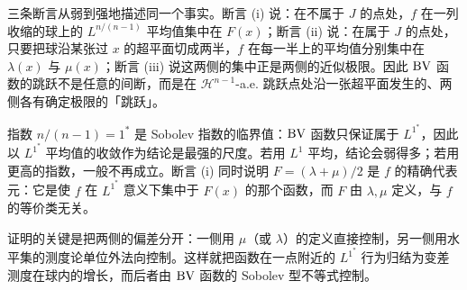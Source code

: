 \documentclass[../../main.tex]{subfiles}%
\begin{document}
\begin{remark}\label{remark:ch05-thm-5-19-动机}
三条断言从弱到强地描述同一个事实。断言 (i) 说：在不属于 $J$ 的点处，$f$ 在一列收缩的球上的 $L^{n/(n-1)}$ 平均值集中在 $F(x)$；断言 (ii) 说：在属于 $J$ 的点处，只要把球沿某张过 $x$ 的超平面切成两半，$f$ 在每一半上的平均值分别集中在 $\lambda(x)$ 与 $\mu(x)$；断言 (iii) 说这两侧的集中正是两侧的近似极限。因此 $\mathrm{BV}$ 函数的跳跃不是任意的间断，而是在 $\mathcal{H}^{n-1}$-a.e. 跳跃点处沿一张超平面发生的、两侧各有确定极限的「跳跃」。

指数 $n/(n-1)=1^{*}$ 是 Sobolev 指数的临界值：$\mathrm{BV}$ 函数只保证属于 $L^{1^{*}}$，因此以 $L^{1^{*}}$ 平均值的收敛作为结论是最强的尺度。若用 $L^1$ 平均，结论会弱得多；若用更高的指数，一般不再成立。断言 (i) 同时说明 $F=(\lambda+\mu)/2$ 是 $f$ 的精确代表元：它是使 $f$ 在 $L^{1^{*}}$ 意义下集中于 $F(x)$ 的那个函数，而 $F$ 由 $\lambda,\mu$ 定义，与 $f$ 的等价类无关。

证明的关键是把两侧的偏差分开：一侧用 $\mu$（或 $\lambda$）的定义直接控制，另一侧用水平集的测度论单位外法向控制。这样就把函数在一点附近的 $L^{1^{*}}$ 行为归结为变差测度在球内的增长，而后者由 $\mathrm{BV}$ 函数的 Sobolev 型不等式控制。
\end{remark}
\end{document}

